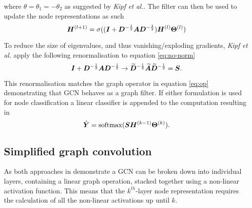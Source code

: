 where $\theta = \theta_1 = - \theta_2$ as suggested by \textit{Kipf et al.}\cite{kipf2016semi}.
The filter can then be used to update the node representations as such
\begin{equation}
    \label{eq:GCN2}
    {\bm{H}}^{(l+1)} = \sigma(({\bm{I}} + {\bm{D}}^{-\frac12}{\bm{A}}{\bm{D}}^{-\frac12}){\bm{H}}^{(l)}\bm{\Theta}^{(l)})
\end{equation}

To reduce the size of eigenvalues, and thus vanishing/exploding gradients, \textit{Kipf et al.}\cite{kipf2016semi} apply the following renormalisation to equation \ref{eq:no-norm} 
\begin{equation}
    \label{eq:norm}
    {\bm{I}} + {\bm{D}}^{-\frac12}{\bm{A}}{\bm{D}}^{-\frac12} \to \widetilde{{\bm{D}}}^{-\frac12}\widetilde{{\bm{A}}}\widetilde{{\bm{D}}}^{-\frac12} = {\bm{S}}.
\end{equation}

This renormalisation matches the graph operator in equation \ref{eq:op} demonstrating that GCN behaves as a graph filter.
If either formulation is used for node classification a linear classifier is appended to the computation resulting in 
\begin{equation}
    \label{eq:cls}
    \hat{{\bm{Y}}} = \operatorname{softmax}({\bm{S}}{\bm{H}}^{(k-1)}\bm{\Theta}^{(k)}).
\end{equation}







\subsection{Simplified graph convolution}
\label{sec:SGC}



As both approaches in  demonstrate a GCN can be broken down into individual layers, containing a linear graph operation, stacked together using a non-linear activation function.
This means that the $k^{th}$-layer node representation requires the calculation of all the non-linear activations up until $k$.

